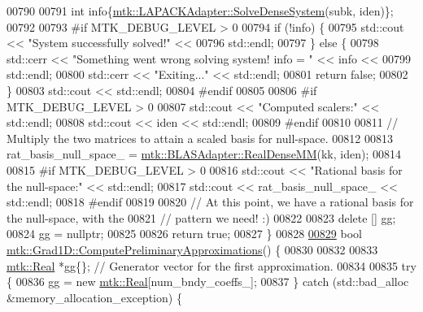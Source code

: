 \begin{DoxyCode}
{{00790 
00791   \textcolor{keywordtype}{int} info\{\hyperlink{classmtk_1_1LAPACKAdapter_a7428bccf74fd4a4af68fb7233846da22}{mtk::LAPACKAdapter::SolveDenseSystem}(subk, iden)\};
00792 
00793 \textcolor{preprocessor}{  #if MTK\_DEBUG\_LEVEL > 0}
00794   \textcolor{keywordflow}{if} (!info) \{
00795     std::cout << \textcolor{stringliteral}{"System successfully solved!"} <<
00796       std::endl;
00797   \} \textcolor{keywordflow}{else} \{
00798     std::cerr << \textcolor{stringliteral}{"Something went wrong solving system! info = "} << info <<
00799       std::endl;
00800     std::cerr << \textcolor{stringliteral}{"Exiting..."} << std::endl;
00801     \textcolor{keywordflow}{return} \textcolor{keyword}{false};
00802   \}
00803   std::cout << std::endl;
00804 \textcolor{preprocessor}{  #endif}
00805 
00806 \textcolor{preprocessor}{  #if MTK\_DEBUG\_LEVEL > 0}
00807   std::cout << \textcolor{stringliteral}{"Computed scalers:"} << std::endl;
00808   std::cout << iden << std::endl;
00809 \textcolor{preprocessor}{  #endif}
00810 
00811   \textcolor{comment}{// Multiply the two matrices to attain a scaled basis for null-space.}
00812 
00813   rat\_basis\_null\_space\_ = \hyperlink{classmtk_1_1BLASAdapter_acebd0e9bfe0bdd609c7fbea98ccfd3b5}{mtk::BLASAdapter::RealDenseMM}(kk, iden);
00814 
00815 \textcolor{preprocessor}{  #if MTK\_DEBUG\_LEVEL > 0}
00816   std::cout << \textcolor{stringliteral}{"Rational basis for the null-space:"} << std::endl;
00817   std::cout << rat\_basis\_null\_space\_ << std::endl;
00818 \textcolor{preprocessor}{  #endif}
00819 
00820   \textcolor{comment}{// At this point, we have a rational basis for the null-space, with the}
00821   \textcolor{comment}{// pattern we need! :)}
00822 
00823   \textcolor{keyword}{delete} [] gg;
00824   gg = \textcolor{keyword}{nullptr};
00825 
00826   \textcolor{keywordflow}{return} \textcolor{keyword}{true};
00827 \}
00828 
\hypertarget{mtk__grad__1d_8cc_source_l00829}{}\hyperlink{classmtk_1_1Grad1D_add4c68a6e78d8b9c2b800b3f96f4757d}{00829} \textcolor{keywordtype}{bool} \hyperlink{classmtk_1_1Grad1D_add4c68a6e78d8b9c2b800b3f96f4757d}{mtk::Grad1D::ComputePreliminaryApproximations}() \{
00830 
00832 
00833   \hyperlink{group__c01-roots_gac080bbbf5cbb5502c9f00405f894857d}{mtk::Real} *gg\{\}; \textcolor{comment}{// Generator vector for the first approximation.}
00834 
00835   \textcolor{keywordflow}{try} \{
00836     gg = \textcolor{keyword}{new} \hyperlink{group__c01-roots_gac080bbbf5cbb5502c9f00405f894857d}{mtk::Real}[num\_bndy\_coeffs\_];
00837   \} \textcolor{keywordflow}{catch} (std::bad\_alloc &memory\_allocation\_exception) \{
}}
\end{DoxyCode}
